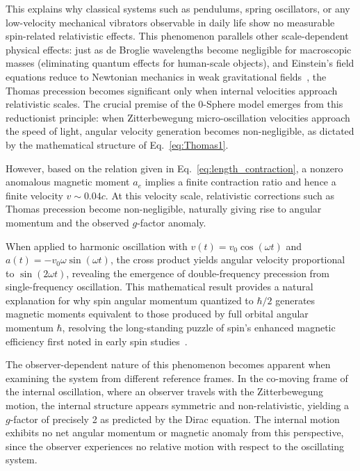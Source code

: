 \documentclass[%
 reprint,
 amsmath,amssymb,
 aps,
]{revtex4-1}
\numberwithin{equation}{section}%
\begin{document}
This explains why classical systems such as pendulums, spring oscillators, or any low-velocity mechanical vibrators observable in daily life show no measurable spin-related relativistic effects. This phenomenon parallels other scale-dependent physical effects: just as de Broglie wavelengths become negligible for macroscopic masses (eliminating quantum effects for human-scale objects), and Einstein's field equations reduce to Newtonian mechanics in weak gravitational fields~\cite{jackson1999}, the Thomas precession becomes significant only when internal velocities approach relativistic scales. The crucial premise of the 0-Sphere model emerges from this reductionist principle: when Zitterbewegung micro-oscillation velocities approach the speed of light, angular velocity generation becomes non-negligible, as dictated by the mathematical structure of Eq.~\eqref{eq:Thomas1}.

However, based on the relation given in Eq.~\eqref{eq:length_contraction}, a nonzero anomalous magnetic moment $a_e$ implies a finite contraction ratio and hence a finite velocity $v \sim 0.04c$. At this velocity scale, relativistic corrections such as Thomas precession become non-negligible, naturally giving rise to angular momentum and the observed $g$-factor anomaly.

When applied to harmonic oscillation with $v(t) = v_0\cos(\omega t)$ and $a(t) = -v_0\omega\sin(\omega t)$, the cross product yields angular velocity proportional to $\sin(2\omega t)$, revealing the emergence of double-frequency precession from single-frequency oscillation. This mathematical result provides a natural explanation for why spin angular momentum quantized to $\hbar/2$ generates magnetic moments equivalent to those produced by full orbital angular momentum $\hbar$, resolving the long-standing puzzle of spin's enhanced magnetic efficiency first noted in early spin studies~\cite{uhlenbeck1925, uhlenbeck1926}.

The observer-dependent nature of this phenomenon becomes apparent when examining the system from different reference frames. In the co-moving frame of the internal oscillation, where an observer travels with the Zitterbewegung motion, the internal structure appears symmetric and non-relativistic, yielding a $g$-factor of precisely 2 as predicted by the Dirac equation. The internal motion exhibits no net angular momentum or magnetic anomaly from this perspective, since the observer experiences no relative motion with respect to the oscillating system.
\end{document}
